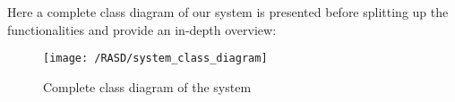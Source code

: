 Here a complete class diagram of our system is presented before splitting up the functionalities and provide an in-depth overview:
\begin{figure}[!ht]
	\centering
	\vspace{0.2cm}
	\texttt{[image: /RASD/system\_class\_diagram]}\\ 
	\vspace{0.5cm}
	\caption{Complete class diagram of the system} \label{fig:system_class_diagram} 
\end{figure}
